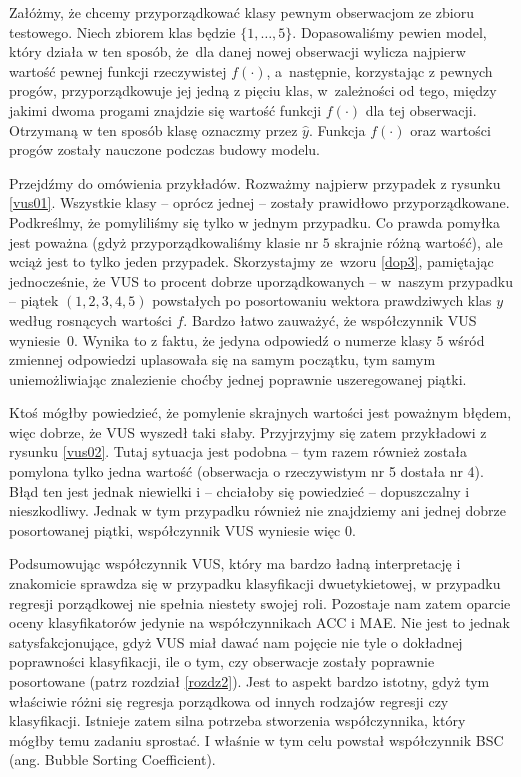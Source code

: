 \documentclass{mini}
\begin{document}
Załóżmy, że chcemy przyporządkować klasy pewnym obserwacjom ze zbioru testowego. Niech zbiorem klas będzie $\lbrace 1, \ldots, 5\rbrace$. Dopasowaliśmy pewien model, który działa w ten sposób, że~dla danej nowej obserwacji wylicza najpierw wartość pewnej funkcji rzeczywistej $f(\cdot)$, a~następnie, korzystając z pewnych progów, przyporządkowuje jej jedną z pięciu klas, w~zależności od tego, między jakimi dwoma progami znajdzie się wartość funkcji $f(\cdot)$ dla tej obserwacji. Otrzymaną w ten sposób klasę oznaczmy przez $\hat{y}$. Funkcja $f(\cdot)$ oraz wartości progów zostały nauczone podczas budowy modelu. 

Przejdźmy do omówienia przykładów. Rozważmy najpierw przypadek z rysunku \ref{vus01}. Wszystkie klasy -- oprócz jednej -- zostały prawidłowo przyporządkowane. Podkreślmy, że pomyliliśmy się tylko w jednym przypadku. Co prawda pomyłka jest poważna (gdyż przyporządkowaliśmy klasie nr $5$ skrajnie różną wartość), ale wciąż jest to tylko jeden przypadek. Skorzystajmy ze~wzoru \eqref{dop3}, pamiętając jednocześnie, że VUS to procent dobrze uporządkowanych -- w~naszym przypadku -- piątek $(1, 2, 3, 4, 5)$ powstałych po posortowaniu wektora prawdziwych klas $y$ według rosnących wartości $f$. Bardzo łatwo zauważyć, że współczynnik VUS wyniesie~$0$. Wynika to z faktu, że jedyna odpowiedź o numerze klasy $5$ wśród zmiennej odpowiedzi uplasowała się na samym początku, tym samym uniemożliwiając znalezienie choćby jednej poprawnie uszeregowanej piątki.

Ktoś mógłby powiedzieć, że pomylenie skrajnych wartości jest poważnym błędem, więc dobrze, że VUS wyszedł taki słaby. Przyjrzyjmy się zatem przykładowi z rysunku \ref{vus02}. Tutaj sytuacja jest podobna -- tym razem również została pomylona tylko jedna wartość (obserwacja o rzeczywistym nr 5 dostała nr 4). Błąd ten jest jednak niewielki i -- chciałoby się powiedzieć -- dopuszczalny i nieszkodliwy. Jednak w tym przypadku również nie znajdziemy ani jednej dobrze posortowanej piątki, współczynnik VUS wyniesie więc $0$.      

Podsumowując współczynnik VUS, który ma bardzo ładną interpretację i znakomicie sprawdza się w przypadku klasyfikacji dwuetykietowej, w przypadku regresji porządkowej nie spełnia niestety swojej roli. Pozostaje nam zatem oparcie oceny klasyfikatorów jedynie na współczynnikach ACC i MAE. Nie jest to jednak satysfakcjonujące, gdyż VUS miał dawać nam pojęcie nie tyle o dokładnej poprawności klasyfikacji, ile o tym, czy obserwacje zostały poprawnie posortowane (patrz rozdział \ref{rozdz2}). Jest to aspekt bardzo istotny, gdyż tym właściwie różni się regresja porządkowa od innych rodzajów regresji czy klasyfikacji. Istnieje zatem silna potrzeba stworzenia współczynnika, który mógłby temu zadaniu sprostać. I właśnie w tym celu powstał współczynnik BSC (ang. Bubble Sorting Coefficient). 
\end{document}
